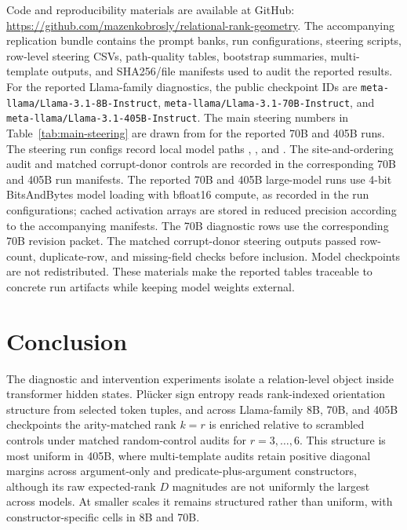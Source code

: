 \documentclass[11pt]{article}
\begin{document}
Code and reproducibility materials are available at GitHub: \url{https://github.com/mazenkobrosly/relational-rank-geometry}. The accompanying replication bundle contains the prompt banks, run configurations, steering scripts, row-level steering CSVs, path-quality tables, bootstrap summaries, multi-template outputs, and SHA256/file manifests used to audit the reported results. For the reported Llama-family diagnostics, the public checkpoint IDs are \texttt{meta-llama/Llama-3.1-8B-Instruct}, \texttt{meta-llama/Llama-3.1-70B-Instruct}, and \texttt{meta-llama/Llama-3.1-405B-Instruct}. The main steering numbers in Table~\ref{tab:main-steering} are drawn from  for the reported 70B and 405B runs. The steering run configs record local model paths , , and . The site-and-ordering audit and matched corrupt-donor controls are recorded in the corresponding 70B and 405B run manifests. The reported 70B and 405B large-model runs use 4-bit BitsAndBytes model loading with bfloat16 compute, as recorded in the run configurations; cached activation arrays are stored in reduced precision according to the accompanying manifests. The 70B diagnostic rows use the corresponding 70B revision packet. The matched corrupt-donor steering outputs passed row-count, duplicate-row, and missing-field checks before inclusion. Model checkpoints are not redistributed. These materials make the reported tables traceable to concrete run artifacts while keeping model weights external.

\section{Conclusion}

The diagnostic and intervention experiments isolate a relation-level object inside transformer hidden states. Pl\"ucker sign entropy reads rank-indexed orientation structure from selected token tuples, and across Llama-family 8B, 70B, and 405B checkpoints the arity-matched rank $k=r$ is enriched relative to scrambled controls under matched random-control audits for $r=3,\ldots,6$. This structure is most uniform in 405B, where multi-template audits retain positive diagonal margins across argument-only and predicate-plus-argument constructors, although its raw expected-rank $D$ magnitudes are not uniformly the largest across models. At smaller scales it remains structured rather than uniform, with constructor-specific cells in 8B and 70B.
\end{document}

